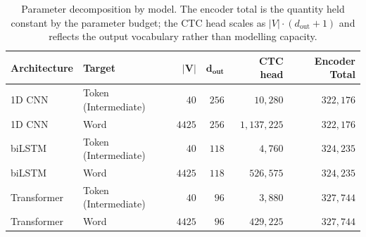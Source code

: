 \begin{table}[htbp]
    \centering
    \caption{Parameter decomposition by model. The encoder total is the quantity held constant by the parameter budget; the CTC head scales as $|V| \cdot (d_{\text{out}} + 1)$ and reflects the output vocabulary rather than modelling capacity.}
    \label{tab:param_decomposition}
    \begin{tabular}{llrrrr}
        \toprule
        \textbf{Architecture} & \textbf{Target} & $\mathbf{|V|}$ & $\mathbf{d_{\text{out}}}$ & \textbf{CTC head} & \textbf{Encoder Total} \\
        \midrule
        1D CNN & Token (Intermediate) & $40$ & $256$ & $10{,}280$ & $322{,}176$ \\
        1D CNN & Word & $4425$ & $256$ & $1{,}137{,}225$ & $322{,}176$ \\
        \midrule
        biLSTM & Token (Intermediate) & $40$ & $118$ & $4{,}760$ & $324{,}235$ \\
        biLSTM & Word & $4425$ & $118$ & $526{,}575$ & $324{,}235$ \\
        \midrule
        Transformer & Token (Intermediate) & $40$ & $96$ & $3{,}880$ & $327{,}744$ \\
        Transformer & Word & $4425$ & $96$ & $429{,}225$ & $327{,}744$ \\
        \bottomrule
    \end{tabular}
\end{table}